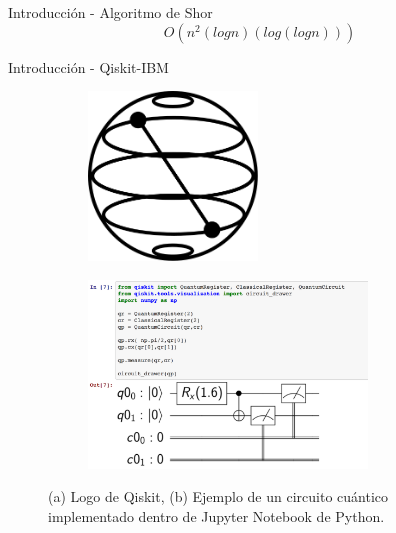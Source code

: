\begin{frame}{Introducción - Algoritmo de Shor}
    \begin{equation}
    O(n^2(logn)(log(logn)))
    \label{eq:compledidad_cuantica}
\end{equation}
\end{frame}
\begin{frame}{Introducción - Qiskit-IBM}
    \begin{figure}[H]
    \begin{subfigure}{0.4\textwidth}
        \centering
        \caption{}
    \includegraphics[height=4.5cm]{images/Qiskit.png}
    \label{fig:logo_qiskit}
    \end{subfigure}
    \begin{subfigure}{0.4\textwidth}
        \centering
        \caption{}
    \includegraphics[height=5cm]{images/Example_qiskit.png}
    \label{fig:example_qiskit}
    \end{subfigure}
    \caption{(a) Logo de Qiskit, (b) Ejemplo de un circuito cuántico implementado dentro de Jupyter Notebook de Python.}
\end{figure}
\end{frame}